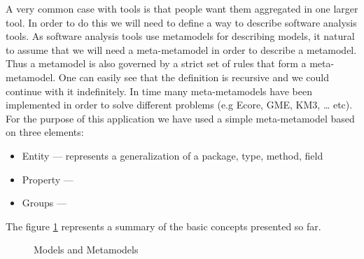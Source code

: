 	A very common case with tools is that people want them aggregated in one larger
tool. In order to do this we will need to define a way to describe software
analysis tools. As software analysis tools use metamodels for describing models,
it natural to assume that we will need a meta-metamodel in order to describe a
metamodel. Thus a metamodel is also governed by a strict set of rules that form
a meta-metamodel. One can easily see that the definition is recursive and we
could continue with it indefinitely. In time many meta-metamodels have been
implemented in order to solve different problems (e.g Ecore, GME, KM3, \ldots{}
etc). For the purpose of this application we have used a simple meta-metamodel
based on three elements: 
	\begin{itemize}
		\item Entity --- represents a generalization of a package, type, method, 
field 
		\item Property ---
		\item Groups ---
	\end{itemize}
	
	The figure \ref{fig:metamodel} represents a summary of the basic concepts
presented so far.
	 

\begin{figure}
\centering
{}
\caption{Models and Metamodels\label{fig:metamodel}}
\end{figure}
		

